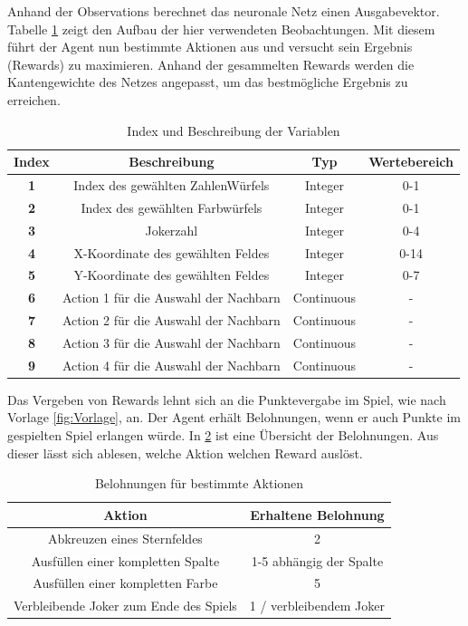 Anhand der Observations berechnet das neuronale Netz einen Ausgabevektor. Tabelle \ref{tab:Aktionbuffer} zeigt den Aufbau der hier verwendeten Beobachtungen. Mit diesem führt der Agent nun bestimmte Aktionen aus und versucht sein Ergebnis (Rewards) zu maximieren.
Anhand der gesammelten Rewards werden die Kantengewichte des Netzes angepasst, um das bestmögliche Ergebnis zu erreichen.

\begin{table}[!h]
    \centering
   
    \begin{tabular}{|c|c|c|c|}
    \hline
    \textbf{Index} & \textbf{Beschreibung} & \textbf{Typ} & \textbf{Wertebereich} \\
    \hline
    \textbf{1} & Index des gewählten ZahlenWürfels & Integer & 0-1 \\
    \hline
    \textbf{2} & Index des gewählten Farbwürfels & Integer & 0-1 \\
    \hline
    \textbf{3} & Jokerzahl & Integer & 0-4 \\
    \hline
    \textbf{4} & X-Koordinate des gewählten Feldes & Integer & 0-14 \\
    \hline
    \textbf{5} & Y-Koordinate des gewählten Feldes & Integer & 0-7 \\
    \hline
    \textbf{6} &  Action 1 für die Auswahl der Nachbarn & Continuous & - \\
    \hline
    \textbf{7} &  Action 2 für die Auswahl der Nachbarn & Continuous & - \\
    \hline
    \textbf{8} &  Action 3 für die Auswahl der Nachbarn & Continuous & - \\
    \hline
    \textbf{9} &  Action 4 für die Auswahl der Nachbarn & Continuous & - \\
    \hline
    \end{tabular}
    \caption{Index und Beschreibung der Variablen}
    \label{tab:Aktionbuffer}
\end{table}

Das Vergeben von Rewards lehnt sich an die Punktevergabe im Spiel, wie nach Vorlage \ref{fig:Vorlage}, an. Der Agent erhält Belohnungen, wenn er auch Punkte im gespielten Spiel erlangen würde. In \ref{tab:rewards} ist eine Übersicht der Belohnungen. Aus dieser lässt sich ablesen, welche Aktion welchen Reward auslöst.

\begin{table}[!h]
    \centering
    \begin{tabular}{|c|c|}
    \hline
    \textbf{Aktion} & \textbf{Erhaltene Belohnung} \\
    \hline
    Abkreuzen eines Sternfeldes & 2 \\
    Ausfüllen einer kompletten Spalte & 1-5 abhängig der Spalte\\
    Ausfüllen einer kompletten Farbe & 5 \\
    Verbleibende Joker zum Ende des Spiels & 1 / verbleibendem Joker \\
    \hline
    \end{tabular}
    \caption{Belohnungen für bestimmte Aktionen}
    \label{tab:rewards}
\end{table}



